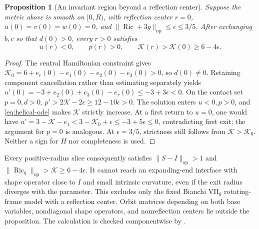 \documentclass[a4paper,11pt]{article}
\numberwithin{equation}{section}
\newtheorem{proposition}[theorem]{Proposition}
\theoremstyle{definition}
\newcommand{\Ric}{\operatorname{Ric}}
\newcommand{\op}{\mathrm{op}}
\begin{document}
\begin{proposition}[An invariant region beyond a reflection center]\label{prop:helical}
Suppose the metric above is smooth on $[0,R)$, with reflection center $r=0$,
$u(0)=v(0)=w(0)=0$, and $\|\Ric+3g\|_{\op}\le\epsilon\le3/5$.
After exchanging $b,c$ so that $d(0)>0$, every $r>0$ satisfies
\[
 u(r)<0,\qquad p(r)>0,\qquad
 \mathcal K(r)>\mathcal K(0)\ge6-4\epsilon.
\]
\end{proposition}
\begin{proof}
The central Hamiltonian constraint gives
$\mathcal K_0=6+e_r(0)-e_1(0)-e_2(0)-e_3(0)>0$, so $d(0)\ne0$.
Retaining component cancellation rather than estimating separately yields
$u'(0)=-3+e_2(0)+e_3(0)-e_r(0)\le-3+3\epsilon<0$.
On the contact set $p=0,d>0$,
$p'>2\mathcal K-2\epsilon\ge12-10\epsilon>0$.
The solution enters $u<0,p>0$, and \eqref{eq:helical-ode} makes $\mathcal K$ strictly increase.
At a first return to $u=0$, one would have
$u'=3-\mathcal K-e_1<3-\mathcal K_0+\epsilon\le-3+5\epsilon\le0$,
contradicting first exit; the argument for $p=0$ is analogous.
At $\epsilon=3/5$, strictness still follows from $\mathcal K>\mathcal K_0$.
Neither a sign for $H$ nor completeness is used.
\end{proof}
Every positive-radius slice consequently satisfies $\|S-I\|_{\op}>1$ and
$\|\Ric_q\|_{\op}>\mathcal K\ge6-4\epsilon$.
It cannot reach an expanding-end interface with shape operator close to $I$ and small intrinsic curvature, even if the exit radius diverges with the parameter.
This excludes only the fixed Bianchi VII$_0$ rotating-frame model with a reflection center.
Orbit matrices depending on both base variables, nondiagonal shape operators, and nonreflection centers lie outside the proposition.
The calculation is checked componentwise by .
\end{document}
